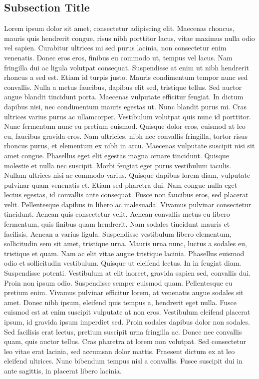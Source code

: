 \subsection{Subsection Title}
Lorem ipsum dolor sit amet, consectetur adipiscing elit. Maecenas rhoncus, mauris quis hendrerit congue, risus nibh porttitor lacus, vitae maximus nulla odio vel sapien. Curabitur ultrices mi sed purus lacinia, non consectetur enim venenatis. Donec eros eros, finibus eu commodo ut, tempus vel lacus. Nam fringilla dui ac ligula volutpat consequat. Suspendisse at enim ut nibh hendrerit rhoncus a sed est. Etiam id turpis justo. Mauris condimentum tempor nunc sed convallis. Nulla a metus faucibus, dapibus elit sed, tristique tellus. Sed auctor augue blandit tincidunt porta.
Maecenas vulputate efficitur feugiat. In dictum dapibus nisi, nec condimentum mauris egestas ut. Nunc blandit purus mi. Cras ultrices varius purus ac ullamcorper. Vestibulum volutpat quis nunc id porttitor. Nunc fermentum nunc eu pretium euismod. Quisque dolor eros, euismod at leo eu, faucibus gravida eros. Nam ultricies, nibh nec convallis fringilla, tortor risus rhoncus purus, et elementum ex nibh in arcu. Maecenas vulputate suscipit nisi sit amet congue. Phasellus eget elit egestas magna ornare tincidunt. Quisque molestie et nulla nec suscipit. Morbi feugiat eget purus vestibulum iaculis.
Nullam ultrices nisi ac commodo varius. Quisque dapibus lorem diam, vulputate pulvinar quam venenatis et. Etiam sed pharetra dui. Nam congue nulla eget lectus egestas, id convallis ante consequat. Fusce non faucibus eros, sed placerat velit. Pellentesque dapibus in libero ac malesuada. Vivamus pulvinar consectetur tincidunt. Aenean quis consectetur velit. Aenean convallis metus eu libero fermentum, quis finibus quam hendrerit. Nam sodales tincidunt mauris et facilisis. Aenean a varius ligula. Suspendisse vestibulum libero elementum, sollicitudin sem sit amet, tristique urna. Mauris urna nunc, luctus a sodales eu, tristique et quam.
Nam ac elit vitae augue tristique lacinia. Phasellus euismod odio et sollicitudin vestibulum. Quisque ut eleifend lectus. In in feugiat diam. Suspendisse potenti. Vestibulum at elit laoreet, gravida sapien sed, convallis dui. Proin non ipsum odio. Suspendisse semper euismod quam. Pellentesque eu pretium enim. Vivamus pulvinar efficitur lorem, at venenatis augue sodales sit amet. Donec nibh ipsum, eleifend quis tempus a, hendrerit eget nulla.
Fusce euismod est at enim suscipit vulputate at non eros. Vestibulum eleifend placerat ipsum, id gravida ipsum imperdiet sed. Proin sodales dapibus dolor non sodales. Sed facilisis erat lectus, pretium suscipit urna fringilla ac. Donec nec convallis quam, quis auctor tellus. Cras pharetra at lorem non volutpat. Sed consectetur leo vitae erat lacinia, sed accumsan dolor mattis. Praesent dictum ex at leo eleifend ultrices. Nunc bibendum tempus nisl a convallis. Fusce suscipit dui in ante sagittis, in placerat libero lacinia. 
